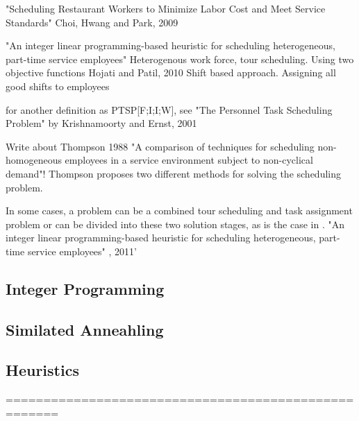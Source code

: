 "Scheduling Restaurant Workers to Minimize Labor Cost and Meet Service Standards" Choi, Hwang and Park, 2009

"An integer linear programming-based heuristic for scheduling heterogeneous, part-time service employees" Heterogenous work force, tour scheduling. Using two objective functions Hojati and Patil, 2010 
Shift based approach. Assigning all good shifts to employees


for another definition as PTSP[F;I;I;W], see "The Personnel Task Scheduling Problem" by Krishnamoorty and Ernst, 2001

Write about Thompson 1988 "A comparison of techniques for scheduling non-homogeneous employees in a service environment subject to non-cyclical demand"! Thompson proposes two different methods for solving the scheduling problem.

In some cases, a problem can be a combined tour scheduling and task assignment problem or can be divided into these two solution stages, as is the case in \cite{keylist}. "An integer linear programming-based heuristic for scheduling heterogeneous, part-time service employees" , 2011'

\subsection{Integer Programming}

\subsection{Similated Anneahling}


\subsection{Heuristics}


=====================================================

